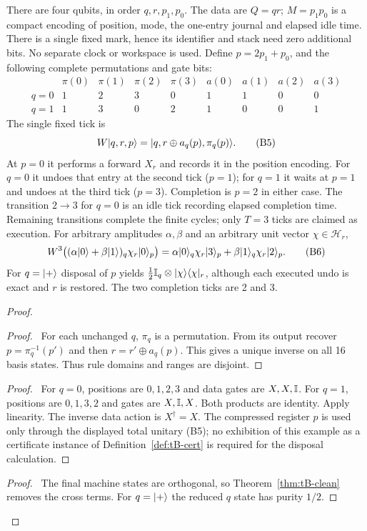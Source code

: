 \begin{counterexample}\label{ex:tB-delay}
There are four qubits, in order $q,r,p_1,p_0$. The data are $Q=qr$;
$M=p_1p_0$ is a compact encoding of position, mode, the one-entry journal
and elapsed idle time. There is a single fixed mark, hence its identifier
and stack need zero additional bits. No separate clock or workspace is
used. Define $p=2p_1+p_0$, and the following complete permutations and
gate bits:
\[
\begin{array}{c|rrrr|rrrr}
 &\pi(0)&\pi(1)&\pi(2)&\pi(3)&a(0)&a(1)&a(2)&a(3)\\\hline
 q=0&1&2&3&0&1&1&0&0\\
 q=1&1&3&0&2&1&0&0&1
\end{array}
\]
The single fixed tick is
\[
 W\lvert q,r,p\rangle=\lvert q,r\oplus a_q(p),\pi_q(p)\rangle.          \tag{B5}
\]
At $p=0$ it performs a forward $X_r$ and records it in the position
encoding. For $q=0$ it undoes that entry at the second tick ($p=1$);
for $q=1$ it waits at $p=1$ and undoes at the third tick ($p=3$).
Completion is $p=2$ in either case. The transition $2\to3$ for $q=0$
is an idle tick recording elapsed completion time. Remaining transitions
complete the finite cycles; only $T=3$ ticks are claimed as execution.
For arbitrary amplitudes $\alpha,\beta$ and an arbitrary unit vector
$\chi\in\mathcal H_r$,
\[
 W^3\bigl((\alpha\lvert 0\rangle+\beta\lvert 1\rangle)_q\chi_r\lvert 0\rangle_p\bigr)
 =\alpha\lvert 0\rangle_q\chi_r\lvert 3\rangle_p+
   \beta\lvert 1\rangle_q\chi_r\lvert 2\rangle_p.                         \tag{B6}
\]
For $q=\lvert +\rangle$ disposal of $p$ yields
$\tfrac12\mathbb{I}_q\otimes\lvert \chi\rangle\langle \chi\rvert_r$, although each executed undo is
exact and $r$ is restored. The two completion ticks are 2 and 3.
\end{counterexample}
\begin{proof}
 \begin{proof}\pf\ For each unchanged $q$, $\pi_q$ is a permutation.
 From its output recover $p=\pi_q^{-1}(p')$ and then
 $r=r'\oplus a_q(p)$. This gives a unique inverse on all 16 basis states.
 Thus rule domains and ranges are disjoint.\end{proof}
 \begin{proof}\pf\ For $q=0$, positions are $0,1,2,3$ and data gates
 are $X,X,\mathbb{I}$. For $q=1$, positions are $0,1,3,2$ and gates are
 $X,\mathbb{I},X$. Both products are identity. Apply linearity. The inverse
 data action is $X^\dagger=X$. The compressed register $p$ is used
 only through the displayed total unitary (B5); no exhibition of this
 example as a certificate instance of Definition~\ref{def:tB-cert}
 is required for the disposal calculation.\end{proof}
 \qedstep
 \begin{proof}\pf\ The final machine states are orthogonal, so
 Theorem~\ref{thm:tB-clean} removes the cross terms. For $q=\lvert +\rangle$
 the reduced $q$ state has purity $1/2$.\end{proof}
\end{proof}

